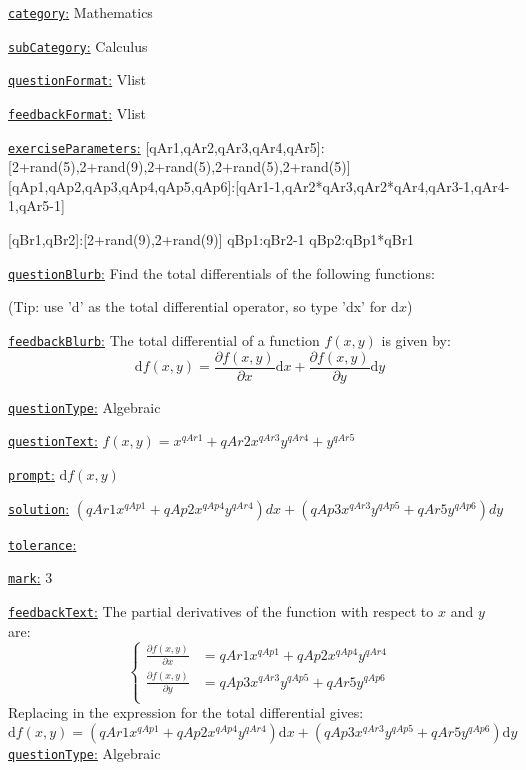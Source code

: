 \documentclass[preview]{standalone}
\newcommand \fieldname[1]{\underline{\texttt{#1}:}}
\begin{document}
\fieldname{category}  %
Mathematics

\fieldname{subCategory} %
Calculus

\fieldname{questionFormat}
Vlist

\fieldname{feedbackFormat}
Vlist

\fieldname{exerciseParameters}
[qAr1,qAr2,qAr3,qAr4,qAr5]:[2+rand(5),2+rand(9),2+rand(5),2+rand(5),2+rand(5)]
[qAp1,qAp2,qAp3,qAp4,qAp5,qAp6]:[qAr1-1,qAr2*qAr3,qAr2*qAr4,qAr3-1,qAr4-1,qAr5-1]

[qBr1,qBr2]:[2+rand(9),2+rand(9)]
qBp1:qBr2-1
qBp2:qBp1*qBr1

\fieldname{questionBlurb}
Find the total differentials of the following functions:

(Tip: use 'd' as the total differential operator, so type 'dx' for $\textrm{d}x$)

\fieldname{feedbackBlurb}
The total differential of a function $f(x,y)$ is given by:
\[
\textrm{d}f(x,y) = \frac{\partial f(x,y)}{\partial x}\textrm{d}x + \frac{\partial f(x,y)}{\partial y}\textrm{d}y
\]

\fieldname{questionType}
Algebraic

\fieldname{questionText}
$f(x,y) = x^{qAr1} + {qAr2}x^{qAr3}y^{qAr4} + y^{qAr5}$

\fieldname{prompt}
$\textrm{d}f(x,y)$

\fieldname{solution}
$({qAr1}x^{qAp1} + {qAp2}x^{qAp4}y^{qAr4})dx + ({qAp3}x^{qAr3}y^{qAp5} + {qAr5}y^{qAp6})dy$

\fieldname{tolerance}


\fieldname{mark}
3

\fieldname{feedbackText}
The partial derivatives of the function with respect to $x$ and $y$ are:
\[
\left\{\begin{aligned}
\frac{\partial f(x,y)}{\partial x} & = {qAr1}x^{qAp1} + {qAp2}x^{qAp4}y^{qAr4}\\
\frac{\partial f(x,y)}{\partial y} & = {qAp3}x^{qAr3}y^{qAp5} + {qAr5}y^{qAp6}\\
\end{aligned}\right.
\]
Replacing in the expression for the total differential gives:
\[
\textrm{d}f(x,y) = \left({qAr1}x^{qAp1} + {qAp2}x^{qAp4}y^{qAr4}\right)\textrm{d}x + \left({qAp3}x^{qAr3}y^{qAp5} + {qAr5}y^{qAp6}\right)\textrm{d}y
\]
\fieldname{questionType}
Algebraic
\end{document}
